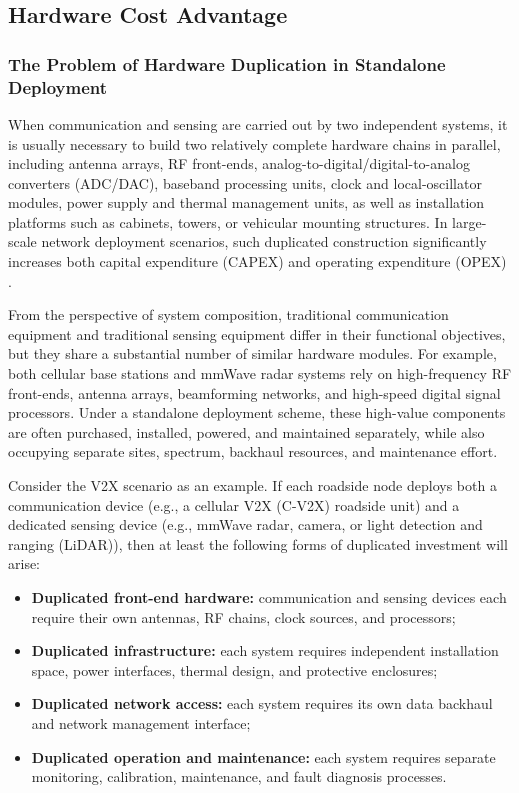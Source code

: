 \subsection{Hardware Cost Advantage}
\label{subsec:ch1-isac-core value-hardware}
\subsubsection{The Problem of Hardware Duplication in Standalone Deployment}
\label{subsubsec:ch1-isac-core value-hardware-duplication}

When communication and sensing are carried out by two independent systems, it is usually necessary to build two relatively complete hardware chains in parallel, including antenna arrays, RF front-ends, analog-to-digital/digital-to-analog converters (ADC/DAC), baseband processing units, clock and local-oscillator modules, power supply and thermal management units, as well as installation platforms such as cabinets, towers, or vehicular mounting structures. In large-scale network deployment scenarios, such duplicated construction significantly increases both capital expenditure (CAPEX) and operating expenditure (OPEX) \cite{Zhang2021ISAC6G,Liu2022ISAC,ITU2030}.

From the perspective of system composition, traditional communication equipment and traditional sensing equipment differ in their functional objectives, but they share a substantial number of similar hardware modules. For example, both cellular base stations and mmWave radar systems rely on high-frequency RF front-ends, antenna arrays, beamforming networks, and high-speed digital signal processors. Under a standalone deployment scheme, these high-value components are often purchased, installed, powered, and maintained separately, while also occupying separate sites, spectrum, backhaul resources, and maintenance effort.

Consider the V2X scenario as an example. If each roadside node deploys both a communication device (e.g., a cellular V2X (C-V2X) roadside unit) and a dedicated sensing device (e.g., mmWave radar, camera, or light detection and ranging (LiDAR)), then at least the following forms of duplicated investment will arise:
\begin{itemize}
    \item \textbf{Duplicated front-end hardware:} communication and sensing devices each require their own antennas, RF chains, clock sources, and processors;
    \item \textbf{Duplicated infrastructure:} each system requires independent installation space, power interfaces, thermal design, and protective enclosures;
    \item \textbf{Duplicated network access:} each system requires its own data backhaul and network management interface;
    \item \textbf{Duplicated operation and maintenance:} each system requires separate monitoring, calibration, maintenance, and fault diagnosis processes.
\end{itemize}

